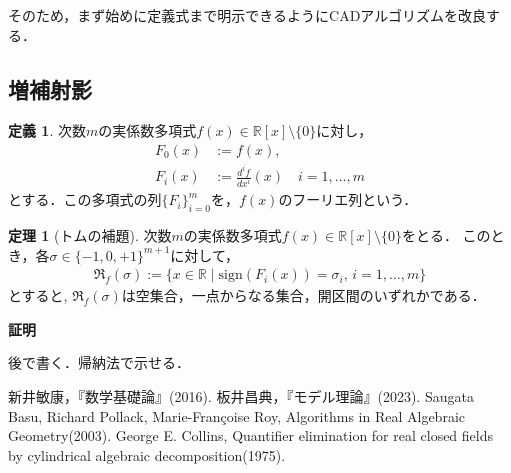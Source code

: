 \documentclass[uplatex, dvipdfmx]{jsarticle}
\makeatletter
\renewenvironment{proof}[1][\proofname]{\par
  \pushQED{\qed}%
  \normalfont \topsep6\p@\@plus6\p@\relax
  \trivlist
  \item\relax
  {\bfseries
  #1\@addpunct{.}}\hspace\labelsep\ignorespaces
}{%
  \popQED\endtrivlist\@endpefalse
}
\newcommand{\R}{\mathbb{R}}
\newcommand{\sign}{\mathrm{sign}}
\theoremstyle{definition}
\newtheorem{definition}{定義}[section]
\newtheorem{theorem}{定理}[section]
\renewcommand{\proofname}{\textbf{証明}}
\makeatother
\begin{document}
そのため，まず始めに定義式まで明示できるようにCADアルゴリズムを改良する．

\subsection{増補射影}

\begin{definition}
     次数$m$の実係数多項式$f(x) \in \R[x] \setminus \{0\}$に対し，
     \begin{align*}
          F_0(x) &:= f(x),\\
          F_i(x) &:= \frac{d^i f}{dx^i}(x) \quad i = 1, \dots, m
     \end{align*}
     とする．この多項式の列$\{F_i\}_{i=0}^m$を，$f(x)$のフーリエ列という．
\end{definition}

\begin{theorem}[トムの補題]
     次数$m$の実係数多項式$f(x) \in \R[x] \setminus \{0\}$をとる．
     このとき，各$\sigma \in \{-1, 0, +1\}^{m+1}$に対して，
     \begin{align*}
          \mathfrak{R}_f(\sigma) := \{x \in \R \mid \sign(F_i(x)) = \sigma_i, \, i = 1, \dots, m \}
     \end{align*}
     とすると, $\mathfrak{R}_f(\sigma)$は空集合，一点からなる集合，開区間のいずれかである．
\end{theorem}

\begin{proof}
     後で書く．帰納法で示せる．
\end{proof}


\begin{thebibliography}{99}
      新井敏康，『数学基礎論』(2016).
      板井昌典，『モデル理論』(2023).
      Saugata Basu, Richard Pollack, Marie-Fran\c{c}oise Roy, Algorithms in Real Algebraic Geometry(2003).
      George E. Collins, Quantifier elimination for real closed fields by cylindrical algebraic decomposition(1975).
\end{thebibliography}
\end{document}
